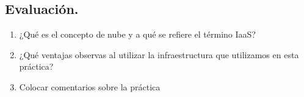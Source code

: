 \documentclass[12pt]{article}
\begin{document}
{\color{blue} \subsection*{\textbf{Evaluación.}}}
\vspace{1em}
\begin{enumerate}
    \item ¿Qué es el concepto de nube y a qué se refiere el término IaaS?
    \item ¿Qué ventajas observas al utilizar la infraestructura que utilizamos en esta práctica?
    \item Colocar comentarios sobre la práctica
\end{enumerate}
\end{document}
